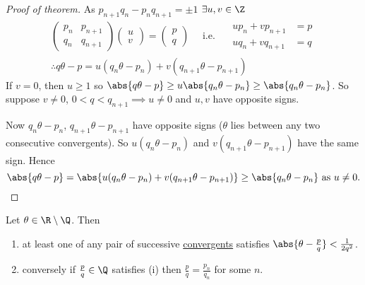 \documentclass{article}
\begin{document}
\begin{proof}[Proof of theorem]
    As $p_{n+1} q_n - p_n q_{n+1} = \pm 1$ $\exists u, v \in \Z$
    \begin{gather*}
        \begin{pmatrix} p_n & p_{n+1} \\ q_n & q_{n+1} \end{pmatrix}
        \begin{pmatrix} u \\ v \end{pmatrix} = \begin{pmatrix} p \\ q \end{pmatrix}
        \quad \text{ i.e. } \quad
        \begin{matrix}
            u p_n + v p_{n+1} &= p \\
            u q_n + v q_{n+1} &= q
        \end{matrix}
        \\
        \therefore q \theta - p = u(q_n \theta - p_n) + v (q_{n+1} \theta - p_{n+1})
    \end{gather*}
    If $v = 0$, then $u \geq 1$ so $\abs{q \theta - p} \geq u \abs{q_n \theta - p_n} \geq \abs{q_n \theta - p_n}$.
    So suppose $v \neq 0$, $0 < q < q_{n+1} \implies u \neq 0$ and $u, v$ have opposite signs.

    Now $q_n \theta - p_n$, $q_{n+1} \theta - p_{n+1}$ have opposite signs ($\theta$ lies between any two consecutive convergents).
    So $u (q_n \theta - p_n)$ and $v (q_{n+1} \theta - p_{n+1})$ have the same sign. Hence
    \begin{equation*}
        \abs{q \theta - p} = \abs{u (q_n \theta - p_n) + v (q_{n+1} \theta - p_{n+1})} \geq \abs{q_n \theta - p_n} \text{ as } u \neq 0. \qedhere
    \end{equation*}
\end{proof}

\begin{nthm}\label{thm:6.6}
    Let $\theta \in \R \setminus \Q$. Then
    \begin{enumerate}[label=(\roman*)]
        \item at least one of any pair of successive \hyperlink{def:convs}{convergents} satisfies $\abs{\theta - \frac{p}{q}} < \frac{1}{2 q^2}$.
        \item conversely if $\frac{p}{q} \in \Q$ satisfies (i) then $\frac{p}{q} = \frac{p_n}{q_n}$ for some $n$.
    \end{enumerate}
\end{nthm}
\end{document}
